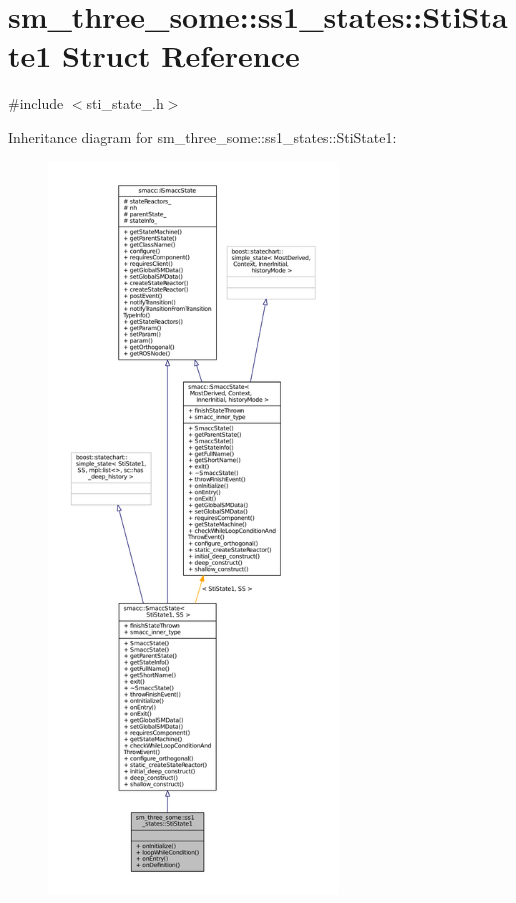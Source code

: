 \hypertarget{structsm__three__some_1_1ss1__states_1_1StiState1}{}\section{sm\+\_\+three\+\_\+some\+:\+:ss1\+\_\+states\+:\+:Sti\+State1 Struct Reference}
\label{structsm__three__some_1_1ss1__states_1_1StiState1}


{\ttfamily \#include $<$sti\+\_\+state\+\_.\+h$>$}



Inheritance diagram for sm\+\_\+three\+\_\+some\+:\+:ss1\+\_\+states\+:\+:Sti\+State1\+:
\nopagebreak
\begin{figure}[H]
\begin{center}
\leavevmode
\includegraphics[height=550pt]{structsm__three__some_1_1ss1__states_1_1StiState1__inherit__graph}
\end{center}
\end{figure}


